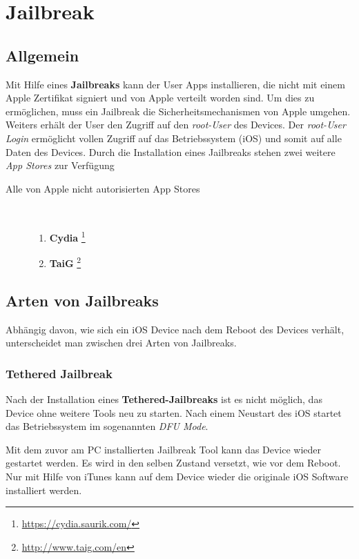 %
%
% 
%
% 


\chapter{Jailbreak}
\label{ch:JB}

\section{Allgemein}
\label{sec:JBAllgemein}

Mit Hilfe eines \textbf{Jailbreaks} kann der User Apps installieren, die nicht mit einem Apple Zertifikat signiert und von Apple verteilt worden sind. Um dies zu ermöglichen, muss ein Jailbreak die Sicherheitsmechanismen von Apple umgehen. Weiters erhält der User den Zugriff auf den \textit{\glqq root-User\grqq{}} des Devices. Der \textit{\glqq root-User Login\grqq{}} ermöglicht vollen Zugriff auf das Betriebssystem (iOS) und somit auf alle Daten des Devices. Durch die Installation eines Jailbreaks stehen zwei weitere \textit{\glqq App Stores\grqq{}} zur Verfügung

\begin{description}
\item[Alle von Apple nicht autorisierten App Stores]~
	\begin{enumerate}
	   	\item \textbf{Cydia} \footnote{\url{https://cydia.saurik.com/}}
		\item \textbf{TaiG} \footnote{\url{http://www.taig.com/en}}
	\end{enumerate}
\end{description}

\section{Arten von Jailbreaks}
\label{sec:JBArten}
Abhängig davon, wie sich ein iOS Device nach dem Reboot des Devices verhält, unterscheidet man zwischen drei Arten von Jailbreaks. 

\subsection{Tethered Jailbreak}
\label{sec:JBTethered}
Nach der Installation eines \textbf{Tethered-Jailbreaks} ist es nicht möglich, das Device ohne weitere Tools neu zu starten. Nach einem Neustart des iOS startet das Betriebssystem im sogenannten \textit{\glqq DFU Mode\grqq{}}. \par
Mit dem zuvor am PC installierten Jailbreak Tool kann das Device wieder gestartet werden. Es wird in den selben Zustand versetzt, wie vor dem Reboot. Nur mit Hilfe von iTunes kann auf dem Device wieder die originale iOS Software installiert werden. 

